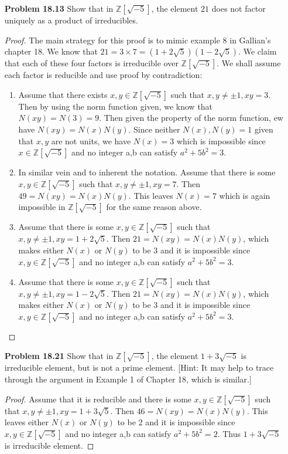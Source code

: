 \documentclass[11pt, oneside]{article}
\newcommand{\Z}{\mathbb Z}
\begin{document}
\begin{enumerate}
\newpage
\item[{\bf Problem 18.13}]  Show that in $\Z[\sqrt{-5}]$, the element $21$ does not factor uniquely as a product of irreducibles.
\begin{proof}
The main strategy for this proof is to mimic example 8 in Gallian's chapter 18.
We know that $21=3\times 7=(1+2\sqrt{5})(1-2\sqrt{5})$. We claim that each of these four factors is irreducible over $\Z[\sqrt{-5}]$. We shall assume each factor is reducible and use proof by contradiction:\begin{enumerate}
    \item Assume that there exists $x,y\in \Z[\sqrt{-5}]$ such that $x,y\neq \pm 1, xy=3$. Then by using the norm function given, we know that $N(xy)=N(3)=9$. Then given the property of the norm function, ew have $N(xy)=N(x)N(y)$. Since neither $N(x),N(y)=1$ given that $x,y$ are not units, we have $N(x)=3$ which is impossible since $x\in \Z[\sqrt{-5}]$ and no integer a,b can satisfy $a^2+5b^2=3$.
    \item In similar vein and to inherent the notation. Assume that there is some $x,y\in \Z[\sqrt{-5}]$ such that $x,y\neq \pm 1, xy=7$. Then $49=N(xy)=N(x)N(y)$. This leaves $N(x)=7$ which is again impossible in $\Z[\sqrt{-5}]$ for the same reason above.
    \item Assume that there is some $x,y\in \Z[\sqrt{-5}]$ such that $x,y\neq \pm 1, xy=1+2\sqrt{5}$. Then $21=N(xy)=N(x)N(y)$, which makes either $N(x)$ or $N(y)$ to be 3 and it is impossible since $x,y\in \Z[\sqrt{-5}]$ and no integer a,b can satisfy $a^2+5b^2=3$. 
    \item Assume that there is some $x,y\in \Z[\sqrt{-5}]$ such that $x,y\neq \pm 1, xy=1-2\sqrt{5}$. Then $21=N(xy)=N(x)N(y)$, which makes either $N(x)$ or $N(y)$ to be 3 and it is impossible since $x,y\in \Z[\sqrt{-5}]$ and no integer a,b can satisfy $a^2+5b^2=3$. 
\end{enumerate}
\end{proof}

\newpage
\item[{\bf Problem 18.21}]  Show that in $\Z[\sqrt{-5}]$, the element $1+3\sqrt{-5}$ is irreducible element, but is not a prime element. [Hint: It may help to trace through the argument in Example 1 of Chapter 18, which is similar.]
\begin{proof}
Assume that it is reducible and there is some $x,y\in \Z[\sqrt{-5}]$ such that $x,y\neq \pm 1, xy=1+3\sqrt{5}$. Then $46=N(xy)=N(x)N(y)$. This leaves either $N(x)$ or $N(y)$ to be 2 and it is impossible since $x,y\in \Z[\sqrt{-5}]$ and no integer a,b can satisfy $a^2+5b^2=2$. Thus $1+3\sqrt{-5}$ is irreducible element.


\end{proof}
\end{enumerate}
\end{document}
